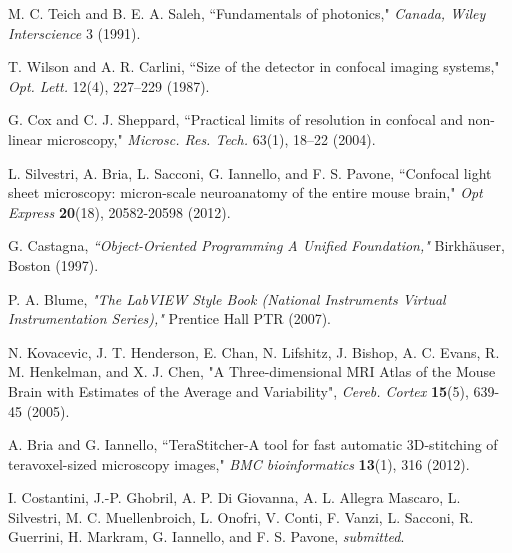 \documentclass[12pt]{spieman}  %
\begin{document}
\begin{thebibliography}{0}
 M. C. Teich and B. E. A. Saleh, ``Fundamentals of photonics," \emph{Canada, Wiley Interscience} 3 (1991).

 T. Wilson and A. R. Carlini, ``Size of the detector in confocal imaging systems," \emph{Opt. Lett.} 12(4), 227–229 (1987).

 G. Cox and C. J. Sheppard, ``Practical limits of resolution in confocal and non-linear microscopy," \emph{Microsc. Res. Tech.} 63(1), 18–22 (2004).
 

 L. Silvestri, A. Bria, L. Sacconi, G. Iannello,  and F. S. Pavone,  ``Confocal light sheet microscopy: micron-scale neuroanatomy of the entire mouse brain," \emph{Opt Express} \textbf{20}(18), 20582-20598 (2012).

 G. Castagna, \emph{``Object-Oriented Programming A Unified Foundation,"} Birkh{\"a}user, Boston (1997).

 P. A. Blume, \emph{"The LabVIEW Style Book (National Instruments Virtual Instrumentation Series),"} Prentice Hall PTR (2007).

 N. Kovacevic, J. T. Henderson, E. Chan, N. Lifshitz, J. Bishop, A. C. Evans, R. M. Henkelman, and X. J. Chen, "A Three-dimensional MRI Atlas of the Mouse Brain with Estimates of the Average and Variability", \emph{Cereb. Cortex} \textbf{15}(5), 639-45 (2005).



 A. Bria and G. Iannello,  ``TeraStitcher-A tool for fast automatic 3D-stitching of teravoxel-sized microscopy images,"  \emph{BMC bioinformatics} \textbf{13}(1), 316 (2012).

 I. Costantini, J.-P. Ghobril, A. P. Di Giovanna, A. L. Allegra Mascaro, L. Silvestri, M. C. Muellenbroich, L. Onofri, V. Conti, F. Vanzi, L. Sacconi, R. Guerrini, H. Markram, G. Iannello, and F. S. Pavone, \emph{submitted}.

\end{thebibliography}


\end{document}
